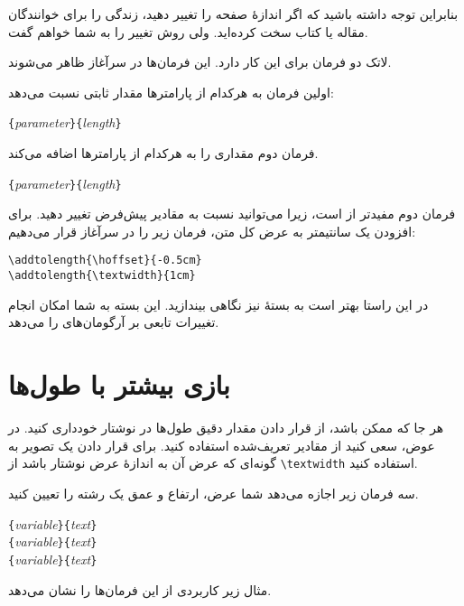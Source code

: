 بنابراین توجه داشته باشید که اگر اندازهٔ صفحه را تغییر دهید، زندگی را برای خوانندگان مقاله یا کتاب سخت کرده‌اید. ولی روش تغییر را به شما خواهم گفت.
 
لاتک دو فرمان برای این کار دارد. این فرمان‌ها در سرآغاز ظاهر می‌شوند.

اولین فرمان به هرکدام از پارامترها مقدار ثابتی نسبت می‌دهد:

\begin{lscommand}
\verb|{|\emph{parameter}\verb|}{|\emph{length}\verb|}|
\end{lscommand}


فرمان دوم مقداری را به هرکدام از پارامترها اضافه می‌کند.

\begin{lscommand}
\verb|{|\emph{parameter}\verb|}{|\emph{length}\verb|}|
\end{lscommand} 


فرمان دوم مفید‌تر  از  است، زیرا می‌توانید نسبت به مقادیر پیش‌فرض تغییر دهید. برای افزودن یک سانتیمتر به عرض کل متن، فرمان زیر را در سرآغاز قرار می‌دهیم:

\begin{code}
\verb|\addtolength{\hoffset}{-0.5cm}|\\
\verb|\addtolength{\textwidth}{1cm}|
\end{code}


در این راستا بهتر است به بستهٔ  نیز نگاهی بیندازید.  این بسته به شما امکان انجام تغییرات تابعی بر آرگومان‌های   را می‌دهد.
\section{بازی بیشتر با طول‌ها}
هر جا که ممکن باشد، از قرار دادن مقدار دقیق طول‌ها در نوشتار‌ خودداری کنید. در عوض، سعی کنید از مقادیر تعریف‌شده استفاده کنید. برای قرار دادن یک تصویر به گونه‌ای که عرض آن به اندازهٔ عرض نوشتار‌ باشد از  \verb|\textwidth| استفاده کنید.

سه فرمان زیر اجازه می‌دهد شما عرض، ارتفاع و عمق یک رشته را تعیین کنید.


\begin{lscommand}
\verb|{|\emph{variable}\verb|}{|\emph{text}\verb|}|\\
\verb|{|\emph{variable}\verb|}{|\emph{text}\verb|}|\\
\verb|{|\emph{variable}\verb|}{|\emph{text}\verb|}|
\end{lscommand}


\noindent مثال زیر کاربردی از این فرمان‌ها را نشان می‌دهد.


